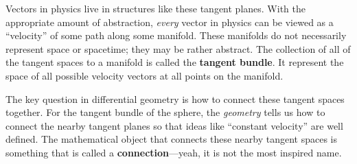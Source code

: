 \documentclass[12pt, oneside]{report}    %
\begin{document}
Vectors in physics live in structures like these tangent planes. With the appropriate amount of abstraction, \emph{every} vector in physics can be viewed as a ``velocity'' of some path along some manifold. These manifolds do not necessarily represent space or spacetime; they may be rather abstract. The collection of all of the tangent spaces to a manifold is called the \textbf{tangent bundle}. It represent the space of all possible velocity vectors at all points on the manifold.

The key question in differential geometry is how to connect these tangent spaces together. For the tangent bundle of the sphere, the \emph{geometry} tells us how to connect the nearby tangent planes so that ideas like ``constant velocity'' are well defined. The mathematical object that connects these nearby tangent spaces is something that is called a \textbf{connection}---yeah, it is not the most inspired name.

\end{document}
